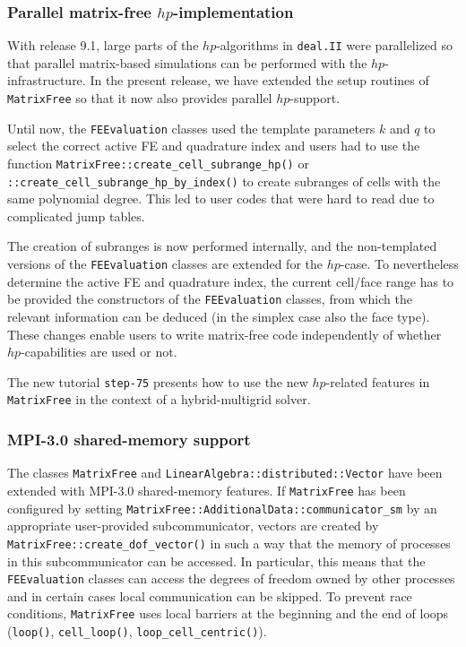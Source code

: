 \documentclass{ansarticle-preprint}
\newcommand{\specialword}[1]{\texttt{#1}}
\newcommand{\dealii}{{\specialword{deal.II}}\xspace}
\begin{document}
\subsubsection{Parallel matrix-free $hp$-implementation}\label{subsubsection:mf:hp}

With release 9.1, large parts of the $hp$-algorithms in \dealii were parallelized so that
parallel matrix-based simulations can be performed with the $hp$-infrastructure. In the present
release, we have extended the setup routines of \texttt{MatrixFree} so that it now also
provides parallel $hp$-support.

Until now, the \texttt{FEEvaluation} classes used the template parameters $k$ and $q$ to select the correct active FE and quadrature index and users had 
to use the function \texttt{MatrixFree::create\_cell\_\allowbreak subrange\_\allowbreak hp()} or
\texttt{::create\_cell\_\allowbreak subrange\_\allowbreak hp\_\allowbreak by\_index()} to create subranges of cells with 
the same polynomial degree. This led to user codes that were hard to read due to complicated jump tables. 

The creation of subranges is now performed internally, and the non-templated versions
of the \texttt{FEEvaluation} classes are extended for the $hp$-case. To nevertheless determine
the active FE and quadrature index, the current cell/face range has to be provided
the constructors of the \texttt{FEEvaluation} classes, from which the relevant information
can be deduced (in the simplex case also the face type). These changes enable
users to write matrix-free code independently of whether $hp$-capabilities are used or not.

The new tutorial \texttt{step-75} presents how to use the new $hp$-related features in \texttt{MatrixFree} 
in the context of a hybrid-multigrid solver.

\subsubsection{MPI-3.0 shared-memory support} 
The classes \texttt{MatrixFree} and \texttt{LinearAlgebra::\allowbreak distributed::\allowbreak Vector} have been extended with 
MPI-3.0 shared-memory features. If \texttt{MatrixFree} has been configured by setting
\texttt{MatrixFree::AdditionalData::communicator\_sm} by an appropriate user-provided subcommunicator,
vectors are created by \texttt{MatrixFree::create\_dof\_vector()} in such a way that the
memory of processes in this subcommunicator can be accessed. In particular, this means 
that the \texttt{FEEvaluation} classes can access the degrees of freedom owned by 
other processes and in certain cases local 
communication can be skipped. To prevent race conditions, \texttt{MatrixFree} uses local
barriers at the beginning and the end of loops (\texttt{loop()}, \texttt{cell\_loop()}, \texttt{loop\_cell\_centric()}).
\end{document}
